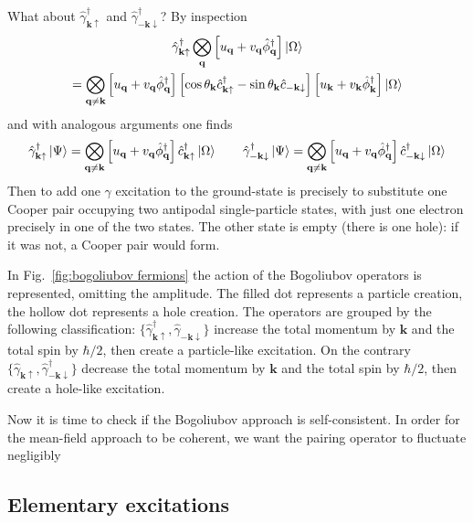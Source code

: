 What about $\hat{\gamma}_{\mathbf{k}\uparrow}^\dagger$ and $\hat{\gamma}_{-\mathbf{k}\downarrow}^\dagger$? By inspection
\begin{multline*}
	\hat{\gamma}_{\mathbf{k}\uparrow}^\dagger \bigotimes_\mathbf{q} \left[{u_\mathbf{q} + v_\mathbf{q} \hat{\phi}_\mathbf{q}^\dagger}\right] \ket{\Omega} \\ = \bigotimes_{\mathbf{q}\neq\mathbf{k}} \left[{u_\mathbf{q} + v_\mathbf{q} \hat{\phi}_\mathbf{q}^\dagger}\right] \left[{\cos\theta_\mathbf{k} \hat{c}_{\mathbf{k}\uparrow}^\dagger - \sin\theta_\mathbf{k} \hat{c}_{-\mathbf{k}\downarrow}}\right] \left[{u_\mathbf{k} + v_\mathbf{k} \hat{\phi}_\mathbf{k}^\dagger}\right] \ket{\Omega}
\end{multline*}
and with analogous arguments one finds
\[
	\hat{\gamma}_{\mathbf{k}\uparrow}^\dagger \ket{\Psi} = \bigotimes_{\mathbf{q}\neq\mathbf{k}} \left[{u_\mathbf{q} + v_\mathbf{q} \hat{\phi}_\mathbf{q}^\dagger}\right] \hat{c}_{\mathbf{k}\uparrow}^\dagger \ket{\Omega}
	\qquad
	\hat{\gamma}_{-\mathbf{k}\downarrow}^\dagger \ket{\Psi} = \bigotimes_{\mathbf{q}\neq\mathbf{k}} \left[{u_\mathbf{q} + v_\mathbf{q} \hat{\phi}_\mathbf{q}^\dagger}\right] \hat{c}_{-\mathbf{k}\downarrow}^\dagger \ket{\Omega}
\]
Then to add one $\gamma$ excitation to the ground-state is precisely to substitute one Cooper pair occupying two antipodal single-particle states, with just one electron precisely in one of the two states. The other state is empty (there is one hole): if it was not, a Cooper pair would form.

In Fig.~\ref{fig:bogoliubov fermions} the action of the Bogoliubov operators is represented, omitting the amplitude. The filled dot represents a particle creation, the hollow dot represents a hole creation. The operators are grouped by the following classification: $\lbrace \hat{\gamma}_{\mathbf{k}\uparrow}^\dagger, \hat{\gamma}_{-\mathbf{k}\downarrow} \rbrace$ increase the total momentum by $\mathbf{k}$ and the total spin by $\hbar/2$, then create a particle-like excitation. On the contrary $\lbrace \hat{\gamma}_{\mathbf{k}\uparrow}, \hat{\gamma}_{-\mathbf{k}\downarrow}^\dagger \rbrace$  decrease the total momentum by $\mathbf{k}$ and the total spin by $\hbar/2$, then create a hole-like excitation. 

{\color{red}Now it is time to check if the Bogoliubov approach is self-consistent. In order for the mean-field approach to be coherent, we want the pairing operator to fluctuate negligibly}

\subsection{Elementary excitations}\label{subsec:elementary excitations}

